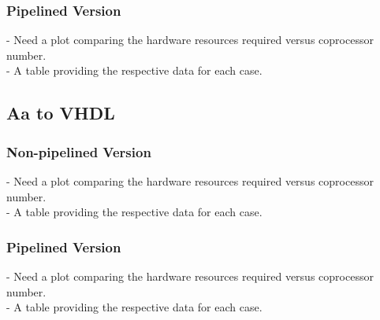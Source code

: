 \subsubsection*{Pipelined Version}

- Need a plot comparing the hardware resources required versus coprocessor number.\\
- A table providing the respective data for each case.\\

\subsection{Aa to VHDL}

\subsubsection*{Non-pipelined Version}

- Need a plot comparing the hardware resources required versus coprocessor number.\\
- A table providing the respective data for each case.\\

\subsubsection*{Pipelined Version}

- Need a plot comparing the hardware resources required versus coprocessor number.\\
- A table providing the respective data for each case.\\

